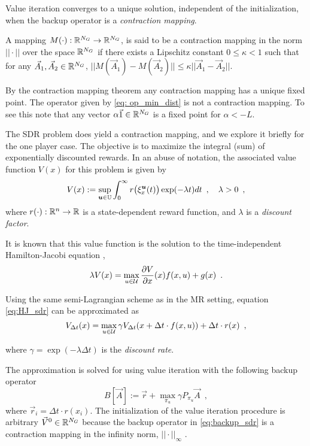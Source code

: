 Value iteration converges to a unique solution, independent of the initialization, when the backup operator is a \emph{contraction mapping}.  
%
\begin{definition} A mapping $M(\cdot): \mathbb{R}^{N_G} \rightarrow \mathbb{R}^{N_G}$, is said to be a contraction mapping in the norm $|| \cdot ||$ over the space $\mathbb{R}^{N_G}$ if there exists a Lipschitz constant $0\leq \kappa < 1$ such that for any $\vec{A}_1, \vec{A}_2 \in \mathbb{R}^{N_G}$, $||M(\vec{A}_1) - M(\vec{A}_2)|| \leq \kappa ||\vec{A}_1 - \vec{A}_2||$. 
\end{definition}

By the contraction mapping theorem any contraction mapping has a unique fixed point. The operator given by \eqref{eq: op_min_dist} is not a contraction mapping. To see this note that any vector $\alpha \vec{1} \in \mathbb{R}^{N_G}$ is a fixed point for $\alpha < -L$.

The SDR problem does yield a contraction mapping, and we explore it briefly for the one player case. The objective is to maximize the integral (sum) of exponentially discounted rewards. In an abuse of notation, the associated value function $V(x)$ for this problem is given by
%
\begin{equation}\label{eq:V_sum_rewards}
V(x) := \sup_{\bm{u} \in \mathbb{U}} \int_{0}^{\infty}r\big(\xi_{x}^{\bm{u}}(t)\big)\exp(-\lambda t) dt\enspace,  \quad \lambda >0 \enspace,
\end{equation}%
\noindent where $r(\cdot):\mathbb{R}^n \rightarrow \mathbb{R}$ is a state-dependent reward function, and $\lambda$ is a \emph{discount factor}.

It is known that this value function is the solution to the time-independent Hamilton-Jacobi equation \cite{Bardi2008},
%
\begin{equation} \label{eq:HJ_sdr}
\lambda V(x) = \max_{u\in\mathcal{U}} \frac{\partial V}{\partial x}(x) f(x, u)+ g(x)\enspace.
\end{equation}

Using the same semi-Lagrangian scheme as in the MR setting, equation \eqref{eq:HJ_sdr} can be approximated as
%
\begin{equation}
V_{\Delta t}(x) = \max_{u\in\mathcal{U}} \gamma V_{\Delta t}(x + \Delta t\cdot f(x, u))  + \Delta t \cdot r(x)\enspace,
\end{equation}
 
\noindent where $\gamma=\exp(-\lambda \Delta t)$ is the \emph{discount rate}.

The approximation is solved for using value iteration with the following backup operator
%
\begin{equation} \label{eq:backup_sdr}
B[\vec{A}] := \vec{r} +  \underset{\pi_u}{\max} \gamma P_{\pi_u} \vec{A}\enspace,
\end{equation}%
\noindent where $\vec{r}_i =\Delta t \cdot r(x_i)$. The initialization of the value iteration procedure is arbitrary $\vec{V}^{0} \in \mathbb{R}^{N_G}$ because the backup  operator in \eqref{eq:backup_sdr} is a contraction mapping in the infinity norm, $||\cdot||_\infty$ \cite{Bertsekas1995}.

